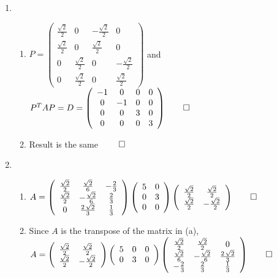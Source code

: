 \documentclass[12pt, a4paper]{article}
\begin{document}
\begin{enumerate}[Q\arabic*.]
  \item 
    \begin{enumerate}[(\alph*)]
      \item $P = \left(\begin{array}{cccc} \frac{\sqrt{2}}{2} & 0 & -\frac{\sqrt{2}}{2} & 0\\ \frac{\sqrt{2}}{2} & 0 & \frac{\sqrt{2}}{2} & 0\\ 0 & \frac{\sqrt{2}}{2} & 0 & -\frac{\sqrt{2}}{2}\\ 0 & \frac{\sqrt{2}}{2} & 0 & \frac{\sqrt{2}}{2} \end{array}\right)$ and $P^TAP = D = \left(\begin{array}{cccc} -1 & 0 & 0 & 0\\ 0 & -1 & 0 & 0\\ 0 & 0 & 3 & 0\\ 0 & 0 & 0 & 3 \end{array}\right) \qed$

      \item Result is the same $\qed$
    \end{enumerate}

  \item 
    \begin{enumerate}[(\alph*)]
      \item $A = \left(\begin{array}{ccc} \frac{\sqrt{2}}{2} & \frac{\sqrt{2}}{6} & -\frac{2}{3}\\ \frac{\sqrt{2}}{2} & -\frac{\sqrt{2}}{6} & \frac{2}{3}\\ 0 & \frac{2\,\sqrt{2}}{3} & \frac{1}{3} \end{array}\right) \left(\begin{array}{cc} 5 & 0\\ 0 & 3\\ 0 & 0 \end{array}\right) \left(\begin{array}{cc} \frac{\sqrt{2}}{2} & \frac{\sqrt{2}}{2}\\ \frac{\sqrt{2}}{2} & -\frac{\sqrt{2}}{2} \end{array}\right) \qed$

      \item Since $A$ is the transpose of the matrix in (a), $A = \left(\begin{array}{cc} \frac{\sqrt{2}}{2} & \frac{\sqrt{2}}{2}\\ \frac{\sqrt{2}}{2} & -\frac{\sqrt{2}}{2} \end{array}\right) \left(\begin{array}{ccc} 5 & 0 & 0\\ 0 & 3 & 0 \end{array}\right) \left(\begin{array}{ccc} \frac{\sqrt{2}}{2} & \frac{\sqrt{2}}{2} & 0\\ \frac{\sqrt{2}}{6} & -\frac{\sqrt{2}}{6} & \frac{2\,\sqrt{2}}{3}\\ -\frac{2}{3} & \frac{2}{3} & \frac{1}{3} \end{array}\right) \qed$


\end{enumerate}
\end{enumerate}
\end{document}
